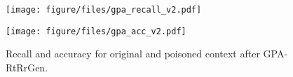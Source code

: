 
\begin{figure}[t]

\centering
    \begin{minipage}[t]{0.48\linewidth}
    \centering
    \texttt{[image: figure/files/gpa\_recall\_v2.pdf]}
     \label{fig:recall}
    \end{minipage}    
    \begin{minipage}[t]{0.48\linewidth}
    \centering
    \texttt{[image: figure/files/gpa\_acc\_v2.pdf]}
     \label{fig:acc}
    \end{minipage}
    \caption{Recall and accuracy for original and poisoned context after GPA-RtRrGen.}
    \label{fig:gpa_analysis}
\end{figure}